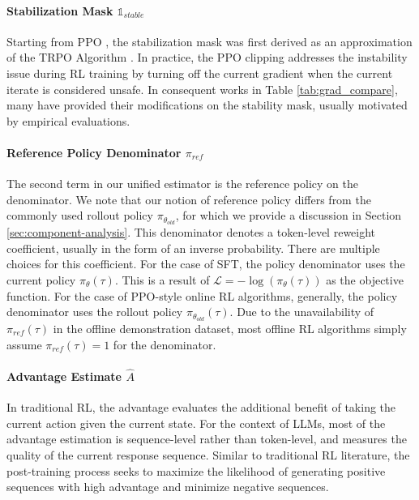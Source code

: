 \documentclass{article} %
\newcommand{\0}{\mathbb{0}}
\newcommand{\1}{\mathbb{1}}
\newcommand{\Lc}{\mathcal{L}}
\begin{document}
\paragraph{Stabilization Mask $\mathbb{1}_{stable}$} Starting from PPO \citep{schulman2017proximal}, the stabilization mask was first derived as an approximation of the TRPO Algorithm \citep{schulman2015trust}.
In practice, the PPO clipping addresses the instability issue during RL training by turning off the current gradient when the current iterate is considered unsafe. In consequent works in Table \ref{tab:grad_compare}, many have provided their modifications on the stability mask, usually motivated by empirical evaluations.



\paragraph{Reference Policy Denominator $\pi_{ref}$} The second term in our unified estimator is the reference policy on the denominator. We note that our notion of reference policy differs from the commonly used rollout policy $\pi_{\theta_{old}}$, for which we provide a discussion in Section \ref{sec:component-analysis}. This denominator denotes a token-level reweight coefficient, usually in the form of an inverse probability. There are multiple choices for this coefficient. For the case of SFT, the policy denominator uses the current policy $\pi_\theta (\tau )$. This is a result of $\Lc = -\log (\pi_\theta (\tau ))$ as the objective function. For the case of PPO-style online RL algorithms, generally, the policy denominator uses the rollout policy $\pi_{\theta_{old}} (\tau )$. Due to the unavailability of $\pi_{ref} (\tau )$ in the offline demonstration dataset, most offline RL algorithms simply assume $\pi_{ref} (\tau )= 1$ for the denominator. 


\paragraph{Advantage Estimate $\hat{A}$} 
In traditional RL, the advantage evaluates the additional benefit of taking the current action given the current state. For the context of LLMs, most of the advantage estimation is sequence-level rather than token-level, and measures the quality of the current response sequence. Similar to traditional RL literature, the post-training process seeks to maximize the likelihood of generating positive sequences with high advantage and minimize negative sequences.
\end{document}

